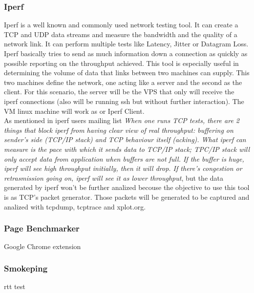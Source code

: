 \subsubsection{Iperf}
Iperf is a well known and commonly used network testing tool. It can create a
TCP and UDP data streams and measure the bandwidth and the quality of a network
link. It can perform multiple tests like Latency, Jitter or Datagram Loss.\\

Iperf basically tries to send as much information down a connection as quickly
as possible reporting on the throughput achieved. This tool is especially useful
in determining the volume of data that links between two machines can supply.
This two machines define the network, one acting like a server and the second as
the client. For this scenario, the server will be the VPS that only will receive
the iperf connections (also will be running ssh but without further
interaction). The VM linux machine will work as or Iperf Client.\\  

As mentioned in iperf users mailing list \textit{
When one runs TCP tests, there are 2 things that block iperf from having clear
view of real throughput: buffering on sender's side (TCP/IP stack) and TCP
behaviour itself (acking). What iperf can measure is the pace with which it
sends data to TCP/IP stack; TPC/IP stack will only accept data from application
when buffers are not full. If the buffer is huge, iperf will see high
throughput initially, then it will drop. If there's congestion or retrasmission
going on, iperf will see it as lower throughput}\cite{iperfmaillist}, but the
data generated by iperf won't be further analized becouse the objective to use 
this tool is as TCP's packet generator. Those packets will be generated to be
captured and analized with tcpdump, tcptrace and xplot.org.\\

\subsubsection{Page Benchmarker}
Google Chrome extension

\subsubsection{Smokeping}
rtt test
